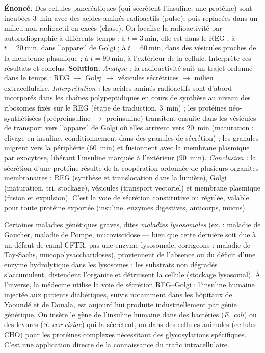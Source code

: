 \documentclass[11pt]{article}
\begin{document}
\begin{exoresolu}
\textbf{Énoncé.} Des cellules pancréatiques (qui sécrètent l'insuline, une protéine) sont incubées \SI{3}{\minute} avec des acides aminés radioactifs (pulse), puis replacées dans un milieu non radioactif en excès (chase). On localise la radioactivité par autoradiographie à différents temps : à $t = \SI{3}{\minute}$, elle est dans le REG ; à $t = \SI{20}{\minute}$, dans l'appareil de Golgi ; à $t = \SI{60}{\minute}$, dans des vésicules proches de la membrane plasmique ; à $t = \SI{90}{\minute}$, à l'extérieur de la cellule. Interprète ces résultats et conclus.
\tcblower
\textbf{Solution.} \emph{Analyse :} la radioactivité suit un trajet ordonné dans le temps : REG $\rightarrow$ Golgi $\rightarrow$ vésicules sécrétrices $\rightarrow$ milieu extracellulaire. \emph{Interprétation :} les acides aminés radioactifs sont d'abord incorporés dans les chaînes polypeptidiques en cours de synthèse au niveau des ribosomes fixés sur le REG (étape de traduction, \SI{3}{\minute}) ; les protéines néo-synthétisées (préproinsuline $\rightarrow$ proinsuline) transitent ensuite dans les vésicules de transport vers l'appareil de Golgi où elles arrivent vers \SI{20}{\minute} (maturation : clivage en insuline, conditionnement dans des granules de sécrétion) ; les granules migrent vers la périphérie (\SI{60}{\minute}) et fusionnent avec la membrane plasmique par exocytose, libérant l'insuline marquée à l'extérieur (\SI{90}{\minute}). \emph{Conclusion :} la sécrétion d'une protéine résulte de la coopération ordonnée de plusieurs organites membranaires : REG (synthèse et translocation dans la lumière), Golgi (maturation, tri, stockage), vésicules (transport vectoriel) et membrane plasmique (fusion et expulsion). C'est la voie de sécrétion constitutive ou régulée, valable pour toute protéine exportée (insuline, enzymes digestives, anticorps, mucus).
\end{exoresolu}

\begin{savaistu}
Certaines maladies génétiques graves, dites \emph{maladies lysosomales} (ex. : maladie de Gaucher, maladie de Pompe, mucoviscidose — bien que cette dernière soit due à un défaut de canal  CFTR, pas une enzyme lysosomale, corrigeons : maladie de Tay-Sachs, mucopolysaccharidoses), proviennent de l'absence ou du déficit d'une enzyme hydrolytique dans les lysosomes : les substrats non dégradés s'accumulent, distendent l'organite et détruisent la cellule (stockage lysosomal). À l'inverse, la médecine utilise la voie de sécrétion REG--Golgi : l'insuline humaine injectée aux patients diabétiques, suivis notamment dans les hôpitaux de Yaoundé et de Douala, est aujourd'hui produite industriellement par génie génétique. On insère le gène de l'insuline humaine dans des bactéries (\emph{E. coli}) ou des levures (\emph{S. cerevisiae}) qui la sécrètent, ou dans des cellules animales (cellules CHO) pour les protéines complexes nécessitant des glycosylations spécifiques. C'est une application directe de la connaissance du trafic intracellulaire.
\end{savaistu}
\end{document}
